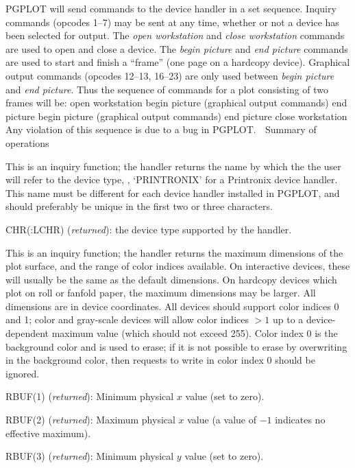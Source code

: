 PGPLOT will send commands to the device handler in a set sequence.
Inquiry commands (opcodes 1--7) may be sent at any time, whether or not 
a device has been selected for output. The {\it open workstation\/} and
{\it close workstation\/} commands are used to open and close a device. The
{\it begin picture\/} and {\it end picture\/} commands are 
used to start and finish a ``frame'' (one page on a hardcopy device). 
Graphical output commands (opcodes 12--13, 16--23) are only used between {\it 
begin picture\/} and {\it end picture\/}. Thus the sequence of commands
for a plot consisting of two frames will be:
\begintt
open workstation
    begin picture
        (graphical output commands)
    end picture
    begin picture
        (graphical output commands)
    end picture
close workstation
\endtt
Any violation of this sequence is due to a bug in PGPLOT.

\beginsection Summary of operations

This is an inquiry function; the handler returns the name by which the
the user will refer to the device type, \eg, `PRINTRONIX' for a 
Printronix device handler. This name must be different for each device 
handler installed in PGPLOT, and should preferably be unique in the 
first two or three characters.

CHR(:LCHR) ({\it returned\/}): the device type supported by the handler.

This is an inquiry function; the handler returns the maximum dimensions
of the plot surface, and the range of color indices available. On
interactive devices, these will usually be the same as the default
dimensions. On hardcopy devices which plot on roll or fanfold paper, the
maximum dimensions may be larger. All dimensions are in device
coordinates. All devices should support color indices 0 and 1; color and 
gray-scale devices will allow color indices $>1$ up to a device-dependent 
maximum value (which should not exceed 255). Color index 0 is the 
background color and is used to erase; if it is not possible to erase by 
overwriting in the background color, then requests to write in color 
index 0 should be ignored.

RBUF(1) ({\it returned\/}): Minimum physical $x$ value (set to zero).

RBUF(2) ({\it returned\/}): Maximum physical $x$ value
(a value of $-1$ indicates no effective maximum).

RBUF(3) ({\it returned\/}): Minimum physical $y$ value (set to zero).

